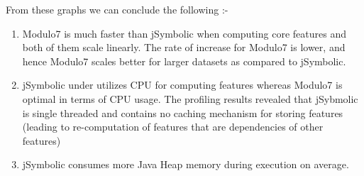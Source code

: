 \newpage

\noindent From these graphs we can conclude the following :-

\begin{enumerate}
\item Modulo7 is much faster than jSymbolic when computing core features and both of them scale linearly. The rate of increase for Modulo7 is lower, and hence Modulo7 scales better for larger datasets as compared to jSymbolic.
\item jSymbolic under utilizes CPU for computing features whereas Modulo7 is optimal in terms of CPU usage. The profiling results revealed that jSybmolic is single threaded and contains no caching mechanism for storing features (leading to re-computation of features that are dependencies of other features)
\item jSymbolic consumes more Java Heap memory during execution on average.
\end{enumerate}


 


